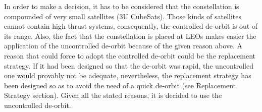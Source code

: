 In order to make a decision, it has to be considered that the constellation is compounded of very small satellites (3U CubeSats). Those kinds of satellites cannot contain high thrust systems, consequently, the controlled de-orbit is out of its range. Also, the fact that the constellation is placed at LEOs makes easier the application of the uncontrolled de-orbit because of the given reason above. A reason that could force to adopt the controlled de-orbit could be the replacement strategy. If it had been designed so that the de-orbit was rapid, the uncontrolled one would provably not be adequate, nevertheless, the replacement strategy has been designed so as to avoid the need of a quick de-orbit (see Replacement Strategy section). 
Given all the stated reasons, it is decided to use the uncontrolled de-orbit. 

